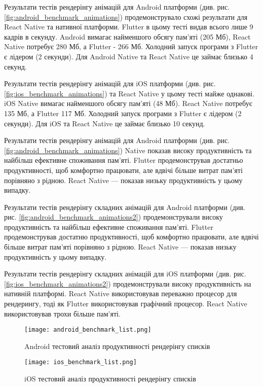 Результати тестів рендерінгу анімацій для Android платформи (див. рис. \ref{fig:android_benchmark_animations})
продемонструвало схожі результати для React Native та нативної платформи.
Flutter в цьому тесті видав всього лише 9 кадрів в секунду.
Android вимагає найменшого обсягу пам'яті (205 Мб), React Native потребує 280 Мб, а Flutter - 266 Мб.
Холодний запуск програми з Flutter є лідером (2 секунди).
Для Android Native та React Native це займає близько 4 секунд.

Результати тестів рендерінгу анімацій для iOS платформи (див. рис. \ref{fig:ios_benchmark_animations})
та React Native у цьому тесті майже однакові.
iOS Native вимагає найменшого обсягу пам'яті (48 Мб). React Native потребує 135 Мб, а Flutter 117 Мб.
Холодний запуск програми з Flutter є лідером (2 секунди).
Для iOS та React Native це займає близько 10 секунд.

Результати тестів рендерінгу анімацій для Android платформи (див. рис. \ref{fig:android_benchmark_animations})
Native показав високу продуктивність та найбільш ефективне споживання пам'яті.
Flutter продемонстрував достатньо продуктивності, щоб комфортно працювати, але вдвічі більше витрат пам'яті порівняно з рідною.
React Native — показав низьку продуктивність у цьому випадку.

Результати тестів рендерінгу складних анімацій для Android платформи (див. рис. \ref{fig:android_benchmark_animations2})
продемонстрували високу продуктивність та найбільш ефективне споживання пам'яті.
Flutter продемонстрував достатню продуктивності, щоб комфортно працювати, але вдвічі більше витрат пам'яті порівняно з рідною.
React Native — показав низьку продуктивність у цьому випадку.

Результати тестів рендерінгу складних анімацій для iOS платформи (див. рис. \ref{fig:ios_benchmark_animations2})
продемонстрували високу продуктивність на нативній платформі.
React Native використовував переважно процесор для рендерингу, тоді як Flutter використовував графічний процесор.
React Native використовував трохи більше пам'яті.

\begin{figure}
    \texttt{[image: android\_benchmark\_list.png]}
    \caption{Android тестовий аналіз продуктивності рендерінгу списків}
    \label{fig:android_benchmark_list}
\end{figure}

\begin{figure}
    \texttt{[image: ios\_benchmark\_list.png]}
    \caption{iOS тестовий аналіз продуктивності рендерінгу списків}
    \label{fig:ios_benchmark_list}
\end{figure}

